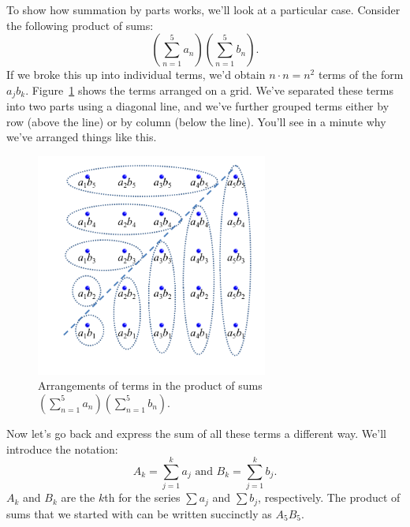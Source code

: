 To show how summation by parts works, we'll look at a particular case. Consider the following product of sums:
\[\left( \sum_{n=1}^{5}a_{n} \right) \left( \sum_{n=1}^{5}b_{n} \right). \] 
If we broke this up into individual terms, we'd obtain $n \cdot n = n^2$ terms of the form $a_j b_k$.  Figure~\ref{fig:IBP}
shows the terms arranged on a grid. We've separated these terms into two parts using  a diagonal line, and we've further
grouped terms either by row (above the line) or by column (below the line). You'll see in a minute why we've arranged things like this.

\begin{figure}[htb]
\begin{center}
	\includegraphics[width=3.0in]{images/IBP.png}
\caption{\label{fig:IBP} Arrangements of terms in the product of sums $\left( \sum_{n=1}^{5}a_{n} \right) \left( \sum_{n=1}^{5}b_{n} \right)$.}
\end{center}
\end{figure} 


Now let's go back and express the sum of all these terms a different way. We'll introduce the notation:
\[ A_{k}= \sum_{j=1}^{k}a_{j} \text{ and } B_{k}= \sum_{j=1}^{k}b_{j}. \]
$A_k$ and $B_k$ are the $k$th  for the series $\sum a_j$ and $\sum b_j$, respectively.
The product of sums that we started with can be written succinctly as $A_{5}B_{5}$. 

